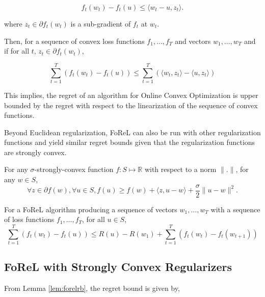 $$f_t(w_t) - f_t(u) \leq \langle w_t - u, z_t \rangle.$$

where $z_t \in \partial f_t(w_t)$ is a sub-gradient of $f_t$ at $w_t$.

Then, for a sequence of convex loss functions $f_1, \ldots, f_T$ and vectors $w_1, \ldots, w_T$ and if for all $t$, $z_t \in \partial f_t(w_t)$,

\begin{equation}
    \sum_{t=1}^T (f_t(w_t) - f_t(u)) \leq \sum_{t=1}^T (\langle w_t, z_t\rangle - \langle u, z_t \rangle)
\end{equation}

This implies, the regret of an algorithm for Online Convex Optimization is upper bounded by the regret with respect to the linearization of the 
sequence of convex functions.


Beyond Euclidean regularization, FoReL can also be run with other regularization functions and yield similar regret bounds given that the regularization functions are 
strongly convex.

\begin{definition}
    For any $\sigma$-strongly-convex function $f: S \mapsto \mathbb{R}$ with respect to a norm $\|.\|$, for any $w \in S$,
    \begin{equation}
        \forall z \in \partial f(w), \forall u \in S, f(u) \geq f(w) + \langle z, u - w\rangle + \frac{\sigma}{2}\| u - w \|^2.
    \end{equation}
\end{definition}



\begin{lemma}\label{lem:forelrb}
    For a FoReL algorithm producing a sequence of vectors $w_1, \ldots, w_T$ with a sequence of loss functions $f_1, \ldots, f_T$, for all $u \in S$, 
    $$\sum_{t=1}^T (f_t(w_t) - f_t(u)) \leq R(u) - R(w_1) + \sum_{t=1}^T (f_t(w_t) - f_t(w_{t+1}))$$
\end{lemma}

\subsection{FoReL with Strongly Convex Regularizers}
From Lemma \ref{lem:forelrb}, the regret bound is given by,

